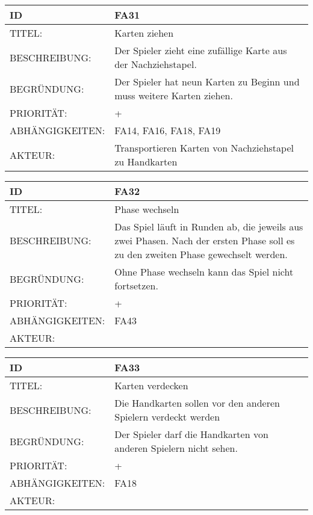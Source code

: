 \documentclass{uulm-assignment}
\begin{document}
    \begin{tabularx}{\textwidth}{|l|X |} \hline
        \textbf{ID} & \textbf{FA31} \\
        \hline
        TITEL: & Karten ziehen\\
        \hline
        BESCHREIBUNG: & Der Spieler zieht eine zufällige Karte aus der Nachziehstapel.
        \\
        \hline
        BEGRÜNDUNG: & Der Spieler hat neun Karten zu Beginn und muss weitere Karten ziehen.\\
        \hline
        PRIORITÄT: & +\\
        \hline
        ABHÄNGIGKEITEN: & FA14, FA16, FA18, FA19\\
        \hline
        AKTEUR: & Transportieren Karten von Nachziehstapel zu Handkarten \\
        \hline
    \end{tabularx}
    
    \begin{tabularx}{\textwidth}{|l|X |} \hline
        \textbf{ID} & \textbf{FA32} \\
        \hline
        TITEL: & Phase wechseln\\
        \hline
        BESCHREIBUNG: & Das Spiel läuft in Runden ab, die jeweils aus zwei Phasen. Nach der ersten Phase soll es zu den zweiten Phase gewechselt werden.
        \\
        \hline
        BEGRÜNDUNG: & Ohne Phase wechseln kann das Spiel nicht fortsetzen.\\
        \hline
        PRIORITÄT: & +\\
        \hline
        ABHÄNGIGKEITEN: & FA43\\
        \hline
        AKTEUR: & \\
        \hline
    \end{tabularx}
    
    \begin{tabularx}{\textwidth}{|l|X |} \hline
        \textbf{ID} & \textbf{FA33} \\
        \hline
        TITEL: & Karten verdecken\\
        \hline
        BESCHREIBUNG: & Die Handkarten sollen vor den anderen Spielern verdeckt werden 
        \\
        \hline
        BEGRÜNDUNG: & Der Spieler darf die Handkarten von anderen Spielern nicht sehen.\\
        \hline
        PRIORITÄT: & +\\
        \hline
        ABHÄNGIGKEITEN: & FA18 \\
        \hline
        AKTEUR: & \\
        \hline
    \end{tabularx}
    
\end{document}
